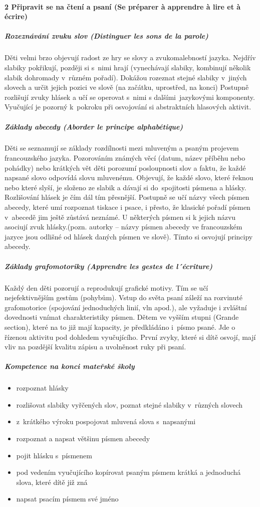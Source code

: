 			\paragraph*{2 Připravit se na čtení a psaní (Se préparer à apprendre à lire et à écrire)}
				\subparagraph{Rozeznávání zvuku slov (Distinguer les sons de la parole)}
					Děti velmi brzo objevují radost ze hry se slovy a zvukomalebností jazyka. Nejdřív slabiky pokřikují, později si s nimi hrají (vynechávají slabiky, kombinují několik slabik dohromady v různém pořadí). Dokážou rozeznat stejné slabiky v jiných slovech a určit jejich pozici ve slově (na začátku, uprostřed, na konci)
					Postupně rozlišují zvuky hlásek a učí se operovat s nimi s dalšími jazykovými komponenty. Vyučující je pozorný k pokroku při osvojování si abstraktních hlasových aktivit.
				\subparagraph{Základy abecedy (Aborder le principe alphabétique)}
					Děti se seznamují se základy rozdílnosti mezi mluveným a psaným projevem francouzského jazyka. Pozorováním známých věcí (datum, název příběhu nebo pohádky) nebo krátkých vět děti porozumí posloupnosti slov a faktu, že každé napsané slovo odpovídá slovu mluvenému. 
					Objevují, že každé slovo, které řeknou nebo které slyší, je složeno ze slabik a dávají si do spojitosti písmena a hlásky. Rozlišování hlásek je čím dál tím přesnější. Postupně se učí názvy všech písmen abecedy, které umí rozpoznat tiskace i psace, i přesto, že klasické pořadí písmen v abecedě jim ještě zůstává neznámé. U některých písmen si k jejich názvu asociují zvuk hlásky.(pozn. autorky – názvy písmen abecedy ve francouzském jazyce jsou odlišné od hlásek daných písmen ve slově). Tímto si osvojují principy abecedy.
				\subparagraph{Základy grafomotoriky (Apprendre les gestes de l´écriture)} 
					Každý den děti pozorují a reprodukují grafické motivy. Tím se učí nejefektivnějším gestům (pohybům). Vstup do světa psaní záleží na rozvinuté grafomotorice (spojování jednoduchých linií, vln apod.), ale vyžaduje i zvláštní dovednosti vnímat charakteristiky písmen. 
					Dětem ve vyšším stupni (Grande section), které na to již mají kapacity, je předkládáno i písmo psané. Jde o řízenou aktivitu pod dohledem vyučujícího. První zvyky, které si dítě osvojí, mají vliv na pozdější kvalitu zápisu a uvolněnost ruky při psaní. 
					
					\subparagraph{Kompetence na konci mateřské školy}
					\begin{itemize}
					\item rozpoznat hlásky
					\item rozlišovat slabiky vyřčených slov, poznat stejné slabiky v různých slovech
					\item z krátkého výroku pospojovat mluvená slova s napsanými
					\item rozpoznat a napsat většinu písmen abecedy
					\item pojit hlásku s písmenem
					\item pod vedením vyučujícího kopírovat psaným písmem krátká a jednoduchá slova, které dítě již zná
					\item napsat psacím písmem své jméno
					\end{itemize}


